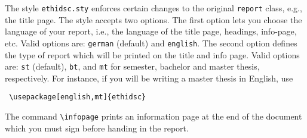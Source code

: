 The style \texttt{ethidsc.sty} enforces certain changes to the original \texttt{report} class, e.g., the title page. The style accepts two options. The first option lets you choose the language of your report, i.e., the language of the title page, headings, info-page, etc. Valid options are: \texttt{german} (default) and \texttt{english}. The second option defines the type of report which will be printed on the title and info page. Valid options are: \texttt{st} (default), \texttt{bt}, and \texttt{mt} for semester, bachelor and master thesis, respectively. For instance, if you will be writing a master thesis in English, use
\begin{verbatim}
 \usepackage[english,mt]{ethidsc}
\end{verbatim}
The command \texttt{\textbackslash infopage} prints an information page at the end of the document which you must sign before handing in the report.